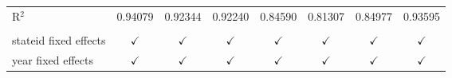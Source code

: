 \begin{table}[htbp]
\begin{tabular}{lccccccc}
      R$^2$                                         & 0.94079              & 0.92344       & 0.92240             & 0.84590                             & 0.81307           & 0.84977              & 0.93595\\  
       \\
      stateid fixed effects                         & $\checkmark$         & $\checkmark$  & $\checkmark$        & $\checkmark$                        & $\checkmark$      & $\checkmark$         & $\checkmark$\\   
      year fixed effects                            & $\checkmark$         & $\checkmark$  & $\checkmark$        & $\checkmark$                        & $\checkmark$      & $\checkmark$         & $\checkmark$\\   
      \bottomrule
   \end{tabular}
\end{table}


